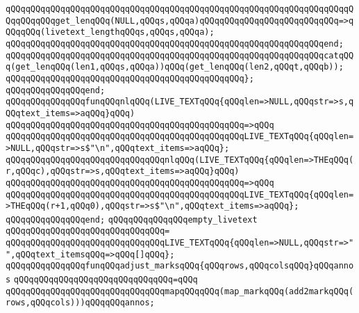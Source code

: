 \verb|qQQqqQQqqQQqqQQqqQQqqQQqqQQqqQQqqQQqqQQqqQQqqQQqqQQqqQQqqQQqqQQqqQQqqQQqqQQqqQQqget_lenqQQq(NULL,qQQqs,qQQqa)qQQqqQQqqQQqqQQqqQQqqQQqqQQq=>qQQqqQQq(livetext_lengthqQQqs,qQQqs,qQQqa);|\newline
\verb|qQQqqQQqqQQqqQQqqQQqqQQqqQQqqQQqqQQqqQQqqQQqqQQqqQQqqQQqqQQqqQQqend;|\newline
\newline
\verb|qQQqqQQqqQQqqQQqqQQqqQQqqQQqqQQqqQQqqQQqqQQqqQQqqQQqqQQqqQQqqQQqcatqQQq(get_lenqQQq(len1,qQQqs,qQQqa))qQQq(get_lenqQQq(len2,qQQqt,qQQqb));|\newline
\verb|qQQqqQQqqQQqqQQqqQQqqQQqqQQqqQQqqQQqqQQqqQQqqQQq};|\newline
\verb|qQQqqQQqqQQqqQQqend;|\newline
\newline
\newline
\verb|qQQqqQQqqQQqqQQqfunqQQqnlqQQq(LIVE_TEXTqQQq{qQQqlen=>NULL,qQQqstr=>s,qQQqtext_items=>aqQQq}qQQq)|\newline
\verb|qQQqqQQqqQQqqQQqqQQqqQQqqQQqqQQqqQQqqQQqqQQqqQQq=>qQQq|\newline
\verb|qQQqqQQqqQQqqQQqqQQqqQQqqQQqqQQqqQQqqQQqqQQqqQQqLIVE_TEXTqQQq{qQQqlen=>NULL,qQQqstr=>s$"\n",qQQqtext_items=>aqQQq};|\newline
\newline
\verb|qQQqqQQqqQQqqQQqqQQqqQQqqQQqqQQqnlqQQq(LIVE_TEXTqQQq{qQQqlen=>THEqQQq(r,qQQqc),qQQqstr=>s,qQQqtext_items=>aqQQq}qQQq)|\newline
\verb|qQQqqQQqqQQqqQQqqQQqqQQqqQQqqQQqqQQqqQQqqQQqqQQq=>qQQq|\newline
\verb|qQQqqQQqqQQqqQQqqQQqqQQqqQQqqQQqqQQqqQQqqQQqqQQqLIVE_TEXTqQQq{qQQqlen=>THEqQQq(r+1,qQQq0),qQQqstr=>s$"\n",qQQqtext_items=>aqQQq};|\newline
\verb|qQQqqQQqqQQqqQQqend;|\newline
\newline
\verb|qQQqqQQqqQQqqQQqempty_livetext|\newline
\verb|qQQqqQQqqQQqqQQqqQQqqQQqqQQqqQQq=|\newline
\verb|qQQqqQQqqQQqqQQqqQQqqQQqqQQqqQQqLIVE_TEXTqQQq{qQQqlen=>NULL,qQQqstr=>"",qQQqtext_itemsqQQq=>qQQq[]qQQq};|\newline
\newline
\verb|qQQqqQQqqQQqqQQqfunqQQqadjust_marksqQQq{qQQqrows,qQQqcolsqQQq}qQQqannos|\newline
\verb|qQQqqQQqqQQqqQQqqQQqqQQqqQQqqQQq=qQQq|\newline
\verb|qQQqqQQqqQQqqQQqqQQqqQQqqQQqqQQqmapqQQqqQQq(map_markqQQq(add2markqQQq(rows,qQQqcols)))qQQqqQQqannos;|\newline
